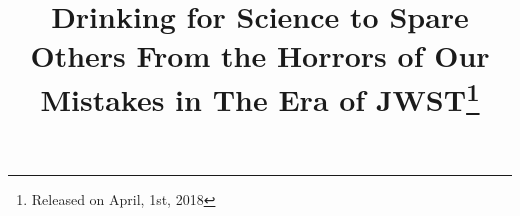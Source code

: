 \documentclass{aastex62}
\begin{document}
\title{Drinking for Science to Spare Others From the Horrors of Our Mistakes in The Era of JWST\footnote{Released on April, 1st, 2018}}


\end{document}
